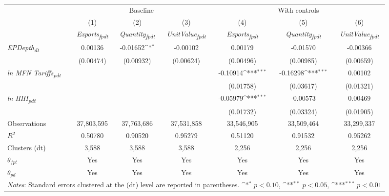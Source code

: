 {
\def\sym#1{\ifmmode^{#1}\else\(^{#1}\)\fi}
\begin{tabular}{l*{6}{c}}
\toprule
&\multicolumn{3}{c}{Baseline}&\multicolumn{3}{c}{With controls}\\\cmidrule(lr){2-4}\cmidrule(lr){5-7}
&(1)&(2)&(3)&(4)&(5)&(6)\\
&\textit{Exports\textsubscript{fpdt}}&\textit{Quantity\textsubscript{fpdt}}&\textit{UnitValue\textsubscript{fpdt}}&\textit{Exports\textsubscript{fpdt}}&\textit{Quantity\textsubscript{fpdt}}&\textit{UnitValue\textsubscript{fpdt}}\\
\midrule
\textit{EPDepth\textsubscript{dt}} & 0.00136 & -0.01652\sym{*} & -0.00102 & 0.00179 & -0.01570 & -0.00366\\
 & (0.00474) & (0.00932) & (0.00624) & (0.00496) & (0.00985) & (0.00659)\\
\addlinespace
\textit{ln MFN Tariffs\textsubscript{pdt}} &  &  &  & -0.10914\sym{***} & -0.16298\sym{***} & 0.00102\\
 &  &  &  & (0.01758) & (0.03617) & (0.01321)\\
\addlinespace
\textit{ln HHI\textsubscript{pdt}} &  &  &  & -0.05979\sym{***} & -0.00573 & 0.00469\\
 &  &  &  & (0.01732) & (0.03324) & (0.01905)\\
\midrule
Observations & 37,803,595 & 37,763,686 & 37,531,858 & 33,546,905 & 33,509,464 & 33,299,337\\
$R^{2}$ & 0.50780 & 0.90520 & 0.95279 & 0.51120 & 0.91532 & 0.95262\\
Clusters (dt) & 3,588 & 3,588 & 3,588 & 2,256 & 2,256 & 2,256\\
$\theta_{fpt}$ & Yes & Yes & Yes & Yes & Yes & Yes\\
$\theta_{pd}$ & Yes & Yes & Yes & Yes & Yes & Yes\\
\bottomrule
\multicolumn{7}{l}{\footnotesize \textit{Notes}: Standard errors clustered at the (dt) level are reported in parentheses. \sym{*} \(p<0.10\), \sym{**} \(p<0.05\), \sym{***} \(p<0.01\)}\\
\end{tabular}
}

